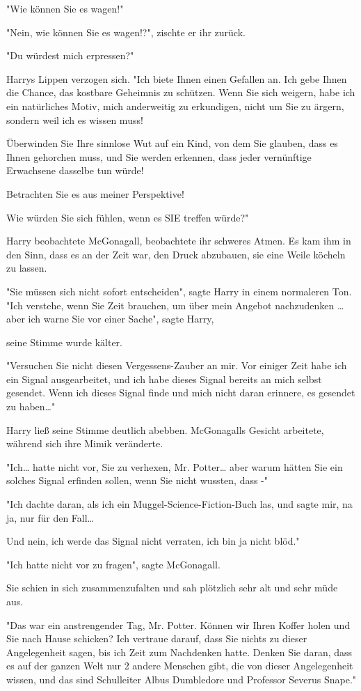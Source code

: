 {"Wie können Sie es wagen!"

"Nein, wie können Sie es wagen!?", zischte er ihr zurück.

"Du würdest mich erpressen?"

Harrys Lippen verzogen sich. "Ich biete Ihnen einen Gefallen an. Ich gebe Ihnen die Chance, das kostbare Geheimnis zu schützen. Wenn Sie sich weigern, habe ich ein natürliches Motiv, mich anderweitig zu erkundigen, nicht um Sie zu ärgern, sondern weil ich es wissen muss!

Überwinden Sie Ihre sinnlose Wut auf ein Kind, von dem Sie glauben, dass es Ihnen gehorchen muss, und Sie werden erkennen, dass jeder vernünftige Erwachsene dasselbe tun würde!

Betrachten Sie es aus meiner Perspektive!

Wie würden Sie sich fühlen, wenn es SIE treffen würde?"

Harry beobachtete McGonagall, beobachtete ihr schweres Atmen. Es kam ihm in den Sinn, dass es an der Zeit war, den Druck abzubauen, sie eine Weile köcheln zu lassen.

"Sie müssen sich nicht sofort entscheiden", sagte Harry in einem normaleren Ton. "Ich verstehe, wenn Sie Zeit brauchen, um über mein Angebot nachzudenken … aber ich warne Sie vor einer Sache", sagte Harry,

seine Stimme wurde kälter.

"Versuchen Sie nicht diesen Vergessens-Zauber an mir. Vor einiger Zeit habe ich ein Signal ausgearbeitet, und ich habe dieses Signal bereits an mich selbst gesendet. Wenn ich dieses Signal finde und mich nicht daran erinnere, es gesendet zu haben…"

Harry ließ seine Stimme deutlich abebben. McGonagalls Gesicht arbeitete, während sich ihre Mimik veränderte.

"Ich… hatte nicht vor, Sie zu verhexen, Mr. Potter… aber warum hätten Sie ein solches Signal erfinden sollen, wenn Sie nicht wussten, dass -"

"Ich dachte daran, als ich ein Muggel-Science-Fiction-Buch las, und sagte mir, na ja, nur für den Fall…

Und nein, ich werde das Signal nicht verraten, ich bin ja nicht blöd."

"Ich hatte nicht vor zu fragen", sagte McGonagall.

Sie schien in sich zusammenzufalten und sah plötzlich sehr alt und sehr müde aus.

"Das war ein anstrengender Tag, Mr. Potter. Können wir Ihren Koffer holen und Sie nach Hause schicken? Ich vertraue darauf, dass Sie nichts zu dieser Angelegenheit sagen, bis ich Zeit zum Nachdenken hatte. Denken Sie daran, dass es auf der ganzen Welt nur 2 andere Menschen gibt, die von dieser Angelegenheit wissen, und das sind Schulleiter Albus Dumbledore und Professor Severus Snape."

}
